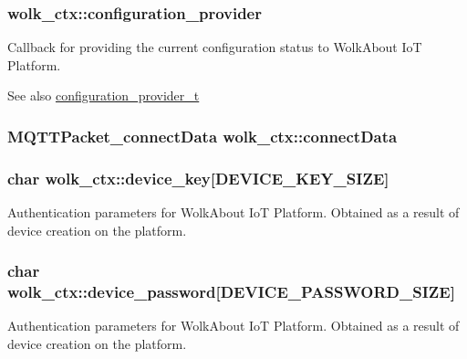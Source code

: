 \subsubsection[{\texorpdfstring{configuration\+\_\+provider}{configuration_provider}}]{ wolk\+\_\+ctx\+::configuration\+\_\+provider}\hypertarget{structwolk__ctx_a982fc36741a8c8cfb5ad3939363cebf8}{}\label{structwolk__ctx_a982fc36741a8c8cfb5ad3939363cebf8}
Callback for providing the current configuration status to Wolk\+About IoT Platform. \begin{DoxySeeAlso}{See also}
\hyperlink{wolk__connector_8h_a64d56254d09f9e452751f32b3c5a39d3}{configuration\+\_\+provider\+\_\+t} 
\end{DoxySeeAlso}
\subsubsection[{\texorpdfstring{connect\+Data}{connectData}}]{\setlength{\rightskip}{0pt plus 5cm}M\+Q\+T\+T\+Packet\+\_\+connect\+Data wolk\+\_\+ctx\+::connect\+Data}\hypertarget{structwolk__ctx_af63fca32333cbb2d7e2b887eff0b2461}{}\label{structwolk__ctx_af63fca32333cbb2d7e2b887eff0b2461}
\subsubsection[{\texorpdfstring{device\+\_\+key}{device_key}}]{\setlength{\rightskip}{0pt plus 5cm}char wolk\+\_\+ctx\+::device\+\_\+key\mbox{[}D\+E\+V\+I\+C\+E\+\_\+\+K\+E\+Y\+\_\+\+S\+I\+ZE\mbox{]}}\hypertarget{structwolk__ctx_a4b67ae9b0271566e7dae56c03053906b}{}\label{structwolk__ctx_a4b67ae9b0271566e7dae56c03053906b}
Authentication parameters for Wolk\+About IoT Platform. Obtained as a result of device creation on the platform. 
\subsubsection[{\texorpdfstring{device\+\_\+password}{device_password}}]{\setlength{\rightskip}{0pt plus 5cm}char wolk\+\_\+ctx\+::device\+\_\+password\mbox{[}D\+E\+V\+I\+C\+E\+\_\+\+P\+A\+S\+S\+W\+O\+R\+D\+\_\+\+S\+I\+ZE\mbox{]}}\hypertarget{structwolk__ctx_af6ea97768cfd0445f8b9535e0e2c354b}{}\label{structwolk__ctx_af6ea97768cfd0445f8b9535e0e2c354b}
Authentication parameters for Wolk\+About IoT Platform. Obtained as a result of device creation on the platform. 

